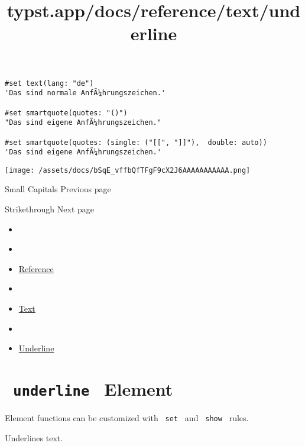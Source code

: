 \begin{verbatim}
#set text(lang: "de")
'Das sind normale AnfÃ¼hrungszeichen.'

#set smartquote(quotes: "()")
"Das sind eigene AnfÃ¼hrungszeichen."

#set smartquote(quotes: (single: ("[[", "]]"),  double: auto))
'Das sind eigene AnfÃ¼hrungszeichen.'
\end{verbatim}

\texttt{[image: /assets/docs/bSqE\_vffbQfTFgF9cX2J6AAAAAAAAAAA.png]}

\href{/docs/reference/text/smallcaps/}{\pandocbounded{}}

{ Small Capitals } { Previous page }

\href{/docs/reference/text/strike/}{\pandocbounded{}}

{ Strikethrough } { Next page }


\title{typst.app/docs/reference/text/underline}

\begin{itemize}
\tightlist
\item
  \href{/docs}{}
\item
  
\item
  \href{/docs/reference/}{Reference}
\item
  
\item
  \href{/docs/reference/text/}{Text}
\item
  
\item
  \href{/docs/reference/text/underline/}{Underline}
\end{itemize}

\section{\texorpdfstring{\texttt{\ underline\ } {{ Element
}}}{ underline   Element }}\label{summary}

\label{element-tooltip}
Element functions can be customized with \texttt{\ set\ } and
\texttt{\ show\ } rules.

Underlines text.

